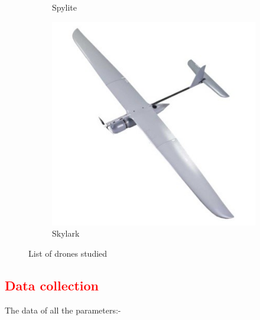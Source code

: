 \documentclass[12 pt]{article}
\begin{document}
\begin{figure}
\begin{subfigure}{.4\textwidth}
        \caption{Spylite}
        \label{Spylite}
    \end{subfigure}
    \centering
    \begin{subfigure}{.4\textwidth}
        \centering
        \includegraphics[width = 0.9\linewidth]{Aircraft pics/Skylark.jpg}
        \caption{Skylark}
        \label{Skylark}
    \end{subfigure}
    \caption{List of drones studied}
    \label{Drone pictures}
\end{figure}


\subsection {\textcolor{red}{Data collection}}

The data of all the parameters:-
\end{document}
